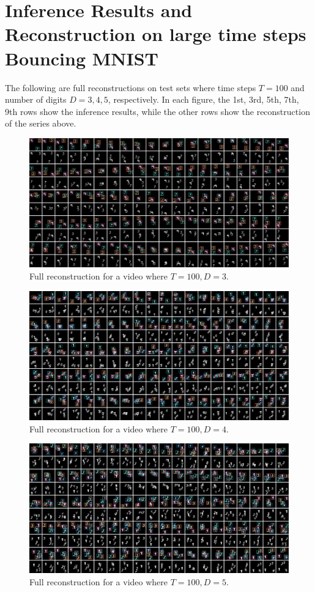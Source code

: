 \documentclass{article}
\theoremstyle{definition}
\begin{document}
\newpage
\section{Inference Results and Reconstruction on large time steps Bouncing MNIST}
\label{appendix:full-recons}
The following are full reconstructions on test sets where time steps $T=100$ and number of digits $D=3, 4, 5$, respectively. In each figure, the 1st, 3rd, 5th, 7th, 9th rows show the inference results, while the other rows show the reconstruction of the series above.
\begin{figure}[!h]
\includegraphics[width=170mm]{figures/T=100-D=3.pdf}
\caption{Full reconstruction for a video where $T=100, D=3$.}
\end{figure}


\begin{figure}[!h]
\includegraphics[width=170mm]{figures/T=100-D=4.pdf}
\caption{Full reconstruction for a video where $T=100, D=4$.}
\end{figure}
\newpage
\begin{figure}[!h]
\includegraphics[width=170mm]{figures/T=100-D=5.pdf}
\caption{Full reconstruction for a video where $T=100, D=5$.}
\end{figure}
\end{document}
